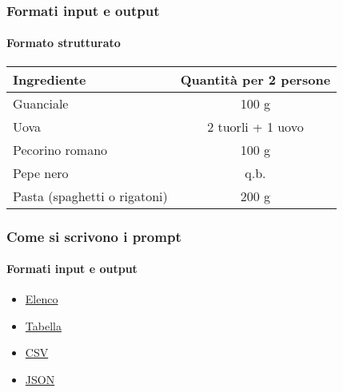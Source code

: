 \begin{exampleframe}
    \frametitle{Formati input e output}
    \framesubtitle{Formato strutturato}

    \begin{table}[h!]
        \centering
        \begin{tabular}{lc}
            \toprule
            \textbf{Ingrediente}            & \textbf{Quantità per 2 persone}   \\ 
            \midrule
            Guanciale                       & 100 g                             \\ 
            Uova                            & 2 tuorli + 1 uovo                 \\ 
            Pecorino romano                 & 100 g                             \\ 
            Pepe nero                       & q.b.                              \\ 
            Pasta (spaghetti o rigatoni)    & 200 g                             \\ 
            \bottomrule
        \end{tabular}
    \end{table}
\end{exampleframe}

        


\begin{exampleframe}
    \frametitle{Come si scrivono i prompt}
    \framesubtitle{Formati input e output}

    \begin{itemize}
        \item \href{https://chatgpt.com/share/6759ada4-a0c8-8003-9a64-fcbce8b7c494}{Elenco}
        \item \href{https://chatgpt.com/share/67655f30-2080-8003-85d4-f5b3b3540716}{Tabella}
        \item \href{https://chatgpt.com/share/67655f61-6fb0-8003-9cb4-5fc6b04dcee5}{CSV}
        \item \href{https://chatgpt.com/share/67655f87-b9f0-8003-8266-7729917000d8}{JSON}
    \end{itemize}
\end{exampleframe}

